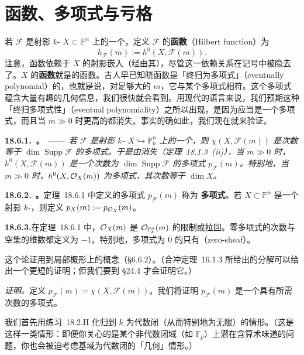
\section{\trHilbert{}函数、\trHilbert{}多项式与亏格}

若 $\mathscr{F}$ 是射影 $k$-\trScheme{} $X\subset\mathbb{P}^n$ 上的一个\trCoherentSheaf，定义 $\mathscr{F}$ 的\textbf{\trHilbert{}函数}（Hilbert function）为
\[
h_{\mathscr{F}}(m):=h^0(X,\mathscr{F}(m)).
\]
注意，\trHilbert{}函数依赖于 $X$ 的射影嵌入（经由其\trLineBundle），尽管这一依赖关系在记号中被隐去了。$X$ 的\textbf{\trHilbert{}函数}就是\trStructureSheaf{}的\trHilbert{}函数。古人早已知晓\trHilbert{}函数是「终归为多项式」（eventually polynomial）的，也就是说，对足够大的 $m$，它与某个多项式相符。这个多项式蕴含大量有趣的几何信息，我们很快就会看到。用现代的语言来说，我们预期这种「终归多项式性」（eventual polynomiality）之所以出现，是因为\trEulerCharacteristic{}应当是一个多项式，而且当 $m\gg 0$ 时更高的\trCohomology{}都消失。事实的确如此，我们现在就来验证。

\textbf{18.6.1.\ \trhTheorem。}\ ——\ \emph{若 $\mathscr{F}$ 是射影 $k$-\trScheme{} $X\hookrightarrow\mathbb{P}^n_k$ 上的一个\trCoherentSheaf，则 $\chi(X,\mathscr{F}(m))$ 是次数等于 $\dim\operatorname{Supp}\mathscr{F}$ 的多项式。于是由\trSerre{}消失（\mbox{定理~18.1.3}~(ii)），当 $m\gg 0$ 时，$h^0(X,\mathscr{F}(m))$ 是一个次数为 $\dim\operatorname{Supp}\mathscr{F}$ 的多项式 $p_{\mathscr{F}}(m)$。特别地，当 $m\gg 0$ 时，$h^0(X,\mathcal{O}_X(m))$ 为多项式，其次数等于 $\dim X$。}

\textbf{18.6.2.}\ \textbf{\trhDefinition{}。}\quad \mbox{定理~18.6.1} 中定义的多项式 $p_{\mathscr{F}}(m)$ 称为 \textbf{\trHilbert{}多项式}。若 $X\subset\mathbb{P}^n$ 是一个射影 $k$-\trScheme，则定义 $p_X(m):=p_{\mathcal{O}_X}(m)$。

\textbf{18.6.3.}\quad 在\mbox{定理~18.6.1} 中，$\mathcal{O}_X(m)$ 是 $\mathcal{O}_{\mathbb{P}^n_k}(m)$ 的限制或拉回。零多项式的次数与空集的维数都定义为 $-1$。特别地，\trHilbert{}多项式为 $0$ 的\trCoherentSheaf{}只有\trZeroSheaf（zero-sheaf）。

这个论证用到局部\trNoetherian{}概形上\trCoherentSheaf{}的\trAssociatedPoint{}概念（\S6.6.2）。（\trHilbert{}合冲定理~\mbox{16.1.3} 所给出的分解可以给出一个更短的证明；但我们要到 \S24.4 才会证明它。）

\emph{证明。}\quad 定义 $p_{\mathscr{F}}(m)=\chi(X,\mathscr{F}(m))$。我们将证明 $p_{\mathscr{F}}(m)$ 是一个具有所需次数的多项式。

我们首先用\mbox{练习~18.2.H} 化归到 $k$ 为代数闭（从而特别地为无限）的情形。（这是这样一类情形：即便你关心的是某个非代数闭域（如 $\mathbb{F}_p$）上潜在含算术味道的问题，你也会被迫考虑基域为代数闭的「几何」情形。）

